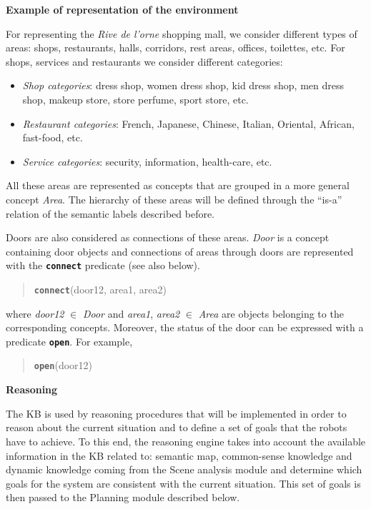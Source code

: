 \vspace{1em}

\noindent 
\textbf{Example of representation of the environment}

For representing the \emph{Rive de l'orne} shopping mall, we consider different types of areas: shops, restaurants, halls, corridors, rest areas, offices, toilettes, etc. For shops, services and restaurants we consider different categories:
\begin{itemize}
\item {\it Shop categories}: dress shop, women dress shop, kid dress shop, men dress shop, makeup store, store perfume, sport store, etc.
\item {\it Restaurant categories}: French, Japanese, Chinese, Italian, Oriental, African, fast-food, etc.
\item {\it Service categories}: security, information, health-care, etc.
\end{itemize}

All these areas are represented as concepts that are grouped in a more general concept \emph{Area}. The hierarchy of these areas will be defined through the ``is-a'' relation of the semantic labels described before.

Doors are also considered as connections of these areas. \emph{Door} is a concept containing door objects and connections of areas through doors are represented with the {\tt\bf connect} predicate (see also below).

\begin{quote}
{\tt\bf connect}(door12, area1, area2)
\end{quote}

\noindent
where \emph{door12} $\in$ \emph{Door} and \emph{area1}, \emph{area2} $\in$ \emph{Area}  are objects belonging to the corresponding concepts. Moreover, the status of the door can be expressed with a predicate {\tt\bf open}. For example,

\begin{quote}
{\tt\bf open}(door12) \\
\end{quote}



\noindent 
\textbf{Reasoning} 


The KB is used by reasoning procedures that will be implemented in order to reason about the current situation and to define a set of goals that the \coaches robots have to achieve.
To this end, the reasoning engine takes into account the available information in the KB related to: semantic map, common-sense knowledge and dynamic knowledge coming from the Scene analysis module and determine which goals for the system are consistent with the current situation. This set of goals is then passed to the Planning module described below.



